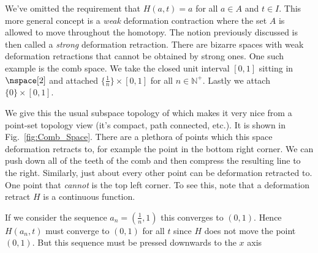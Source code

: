         We've omitted the requirement that $H(a,t)=a$ for all $a\in{A}$
        and $t\in{I}$. This more general concept is a \textit{weak}
        deformation contraction where the set $A$ is
        allowed to move throughout the homotopy. The notion previously
        discussed is then called a \textit{strong} deformation
        retraction. There are bizarre spaces with weak deformation
        retractions that cannot be obtained by strong ones. One such
        example is the comb space. We take the closed unit
        interval $[0,1]$ sitting in $\nspace[2]$ and attached
        $\{\frac{1}{n}\}\times[0,1]$ for all $n\in\mathbb{N}^{+}$.
        Lastly we attach $\{0\}\times[0,1]$.
        \par\hfill\par
        \begin{minipage}[t]{0.54\textwidth}
            We give this the usual subspace topology of which makes it
            very nice from a point-set topology view (it's compact, path
            connected, etc.). It is shown in Fig.~\ref{fig:Comb_Space}.
            There are a plethora of points which this space deformation
            retracts to, for example the point in the bottom right
            corner. We can push down all of the teeth of the comb and
            then compress the resulting line to the right. Similarly,
            just about every other point can be deformation retracted
            to. One point that \textit{cannot} is the top left corner.
            To see this, note that a deformation retract $H$ is a
            continuous function.
        \end{minipage}
        \hfill
        \par\vspace{2.5ex}
        If we consider the sequence $a_{n}=(\frac{1}{n},1)$ this
        converges to $(0,1)$. Hence $H(a_{n},t)$ must converge to
        $(0,1)$ for all $t$ since $H$ does not move the point $(0,1)$.
        But this sequence must be pressed downwards to the $x$ axis
